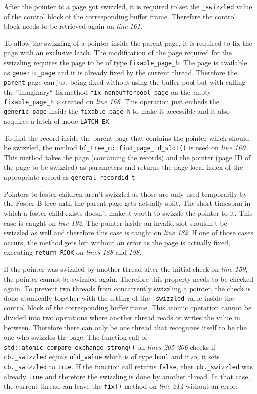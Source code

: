 	After the pointer to a page got swizzled, it is required to set the \lstinline{_swizzled} value of the control block of the corresponding buffer frame. Therefore the control block needs to be retrieved again on \emph{line 161}.
	
	To allow the swizzling of a pointer inside the parent page, it is required to fix the page with an exclusive latch. The modification of the page required for the swizzling requires the page to be of type \lstinline{fixable_page_h}. The page is available as \lstinline{generic_page} and it is already fixed by the current thread. Therefore the \lstinline{parent} page can just being fixed without using the buffer pool but with calling the ''imaginary`` fix method \lstinline{fix_nonbufferpool_page} on the empty \lstinline{fixable_page_h} \lstinline{p} created on \emph{line 166}. This operation just embeds the \lstinline{generic_page} inside the \lstinline{fixable_page_h} to make it accessible and it also acquires a latch of mode \lstinline{LATCH_EX}.
	
	To find the record inside the parent page that contains the pointer which should be swizzled, the method \lstinline{bf_tree_m::find_page_id_slot()} is used on \emph{line 169}. This method takes the page (containing the records) and the pointer (page ID of the page to be swizzled) as parameters and returns the page-local index of the appropriate record as \lstinline{general_recordid_t}.
	
	Pointers to foster children aren't swizzled as those are only used temporarily by the Foster B-tree until the parent page gets actually split. The short timespan in which a foster child exists doesn't make it worth to swizzle the pointer to it. This case is caught on \emph{line 192}. The pointer inside an invalid slot shouldn't be swizzled as well and therefore this case is caught on \emph{line 182}. If one of those cases occurs, the method gets left without an error as the page is actually fixed, executing \lstinline{return RCOK} on \emph{lines 188} and \emph{198}.
	
	If the pointer was swizzled by another thread after the initial check on \emph{line 159}, the pointer cannot be swizzled again. Therefore this property needs to be checked again. To prevent two threads from concurrently swizzling a pointer, the check is done atomically together with the setting of the \lstinline{_swizzled} value inside the control block of the corresponding buffer frame. This atomic operation cannot be divided into two operations where another thread reads or writes the value in between. Therefore there can only be one thread that recognizes itself to be the one who swizzles the page. The function call of \lstinline{std::atomic_compare_exchange_strong()} on \emph{lines 205-206} checks if \lstinline{cb._swizzled} equals \lstinline{old_value} which is of type \lstinline{bool} and if so, it sets \lstinline{cb._swizzled} to \lstinline{true}. If the function call returns \lstinline{false}, then \lstinline{cb._swizzled} was already \lstinline{true} and therefore the swizzling is done by another thread. In that case, the current thread can leave the \lstinline{fix()} method on \emph{line 214} without an error.
	
